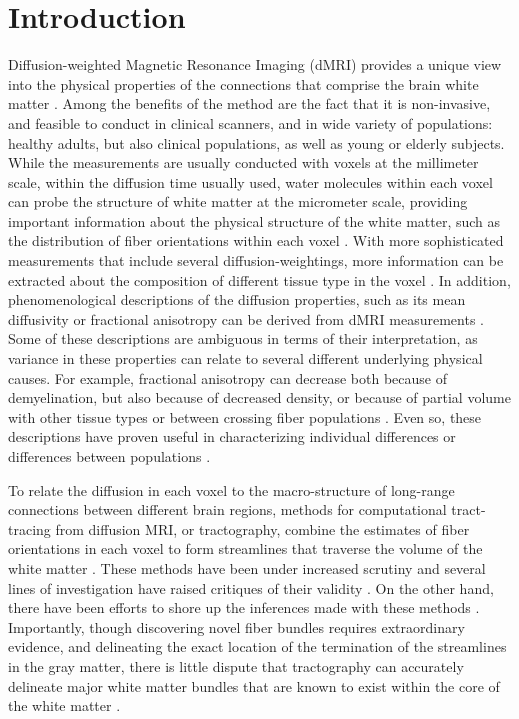 \section*{Introduction}

Diffusion-weighted Magnetic Resonance Imaging (dMRI) provides a unique view into
the physical properties of the connections that comprise the brain white matter
\cite{wandell2016clarifying}. Among the benefits of the method are the fact that
it is non-invasive, and feasible to conduct in clinical scanners, and in wide
variety of populations: healthy adults, but also clinical populations, as well
as young or elderly subjects. While the measurements are usually conducted with
voxels at the millimeter scale, within the diffusion time usually used, water
molecules within each voxel can probe the structure of white matter at the
micrometer scale, providing important information about the physical structure
of the white matter, such as the distribution of fiber orientations within each
voxel \cite{Frank2002-iz, Frank2001-xf}. With more sophisticated measurements
that include several diffusion-weightings, more information can be extracted
about the composition of different tissue type in the voxel
\cite{Jeurissen2014-ab, Kaden2016-ho}. In addition, phenomenological
descriptions of the diffusion properties, such as its mean diffusivity or
fractional anisotropy can be derived from dMRI measurements
\cite{Pierpaoli1996-vj}. Some of these descriptions are ambiguous in terms of
their interpretation, as variance in these properties can relate to several
different underlying physical causes. For example, fractional anisotropy can
decrease both because of demyelination, but also because of decreased density,
or because of partial volume with other tissue types or between crossing fiber
populations \cite{Beaulieu1996-fn, Beaulieu2002-tl}. Even so, these descriptions
have proven useful in characterizing individual differences or differences
between populations .

To relate the diffusion in each voxel to the macro-structure of long-range
connections between different brain regions, methods for computational
tract-tracing from diffusion MRI, or tractography, combine the estimates of
fiber orientations in each voxel to form streamlines that traverse the volume of
the white matter \cite{Conturo1999-je, Mori2002-qi}. These methods have been
under increased scrutiny and several lines of investigation have raised
critiques of their validity \cite{Maier-Hein2017-vb, Thomas2014-ki}. On the
other hand, there have been efforts to shore up the inferences made with these
methods \cite{Pestilli2014NatMeth, Takemura2016-sh, Smith2013-nc, Smith2015-cx,
Smith2015-zt, Rheault2018-wk}. Importantly, though discovering novel fiber
bundles requires extraordinary evidence, and delineating the exact location of
the termination of the streamlines in the gray matter, there is little dispute
that tractography can accurately delineate major white matter bundles that are
known to exist within the core of the white matter \cite{Maier-Hein2017-vb}.

